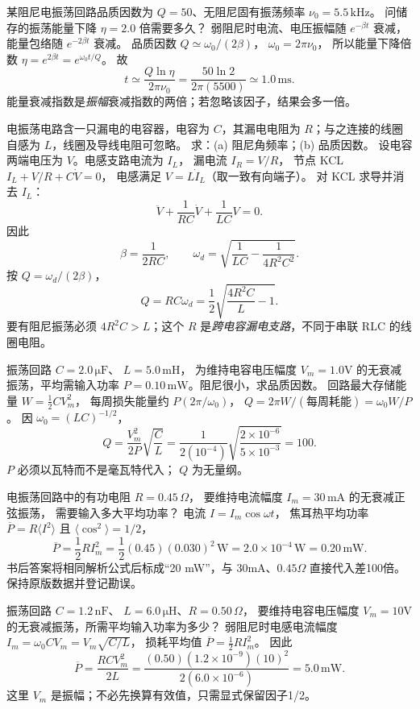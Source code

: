 某阻尼电振荡回路品质因数为 $Q=50$、无阻尼固有振荡频率
$\nu_0=5.5\,\mathrm{kHz}$。
问储存的振荡能量下降 $\eta=2.0$ 倍需要多久？
\exsolution
弱阻尼时电流、电压振幅随 $e^{-\beta t}$ 衰减，能量包络随 $e^{-2\beta t}$ 衰减。
品质因数 $Q\simeq\omega_0/(2\beta)$，
$\omega_0=2\pi\nu_0$，
所以能量下降倍数
$\eta=e^{2\beta t}=e^{\omega_0t/Q}$。
故
\[
\boxed{t\simeq\frac{Q\ln\eta}{2\pi\nu_0}
=\frac{50\ln2}{2\pi(5500)}
\simeq1.0\,\mathrm{ms}}.
\]
\excheck 能量衰减指数是\emph{振幅}衰减指数的两倍；若忽略该因子，结果会多一倍。

电振荡电路含一只漏电的电容器，电容为 $C$，其漏电电阻为 $R$；与之连接的线圈自感为 $L$，线圈及导线电阻可忽略。
求：(a) 阻尼角频率；(b) 品质因数。
\exsolution
设电容两端电压为 $V$。电感支路电流为 $I_L$，
漏电流 $I_R=V/R$，
节点 KCL
$I_L+V/R+C\dot V=0$，
电感满足 $V=L\dot I_L$（取一致有向端子）。
对 KCL 求导并消去 $I_L$：
\[
\ddot V+\frac1{RC}\dot V+\frac1{LC}V=0.
\]
因此
\[
\boxed{\beta=\frac1{2RC}},\qquad
\boxed{\omega_d=\sqrt{\frac1{LC}-\frac1{4R^2C^2}}}.
\]
按 $Q=\omega_d/(2\beta)$，
\[
\boxed{Q=RC\omega_d
=\frac12\sqrt{\frac{4R^2C}{L}-1}}.
\]
\excheck 要有阻尼振荡必须 $4R^2C>L$；这个 $R$ 是\emph{跨电容漏电支路}，不同于串联 RLC 的线圈电阻。

振荡回路 $C=2.0\,\mathrm{\mu F}$、
$L=5.0\,\mathrm{mH}$，
为维持电容电压幅度 $V_m=1.0$V 的无衰减振荡，平均需输入功率
$P=0.10\,\mathrm{mW}$。阻尼很小，求品质因数。
\exsolution
回路最大存储能量
$W=\tfrac12CV_m^2$，
每周损失能量约 $P(2\pi/\omega_0)$，
$Q=2\pi W/(\text{每周耗能})=\omega_0W/P$。
因 $\omega_0=(LC)^{-1/2}$，
\[
\boxed{Q=\frac{V_m^2}{2P}\sqrt{\frac CL}}
=\frac{1}{2(10^{-4})}\sqrt{\frac{2\times10^{-6}}{5\times10^{-3}}}
=\boxed{100}.
\]
\excheck $P$ 必须以瓦特而不是毫瓦特代入；
$Q$ 为无量纲。

电振荡回路中的有功电阻 $R=0.45\,\Omega$，
要维持电流幅度
$I_m=30\,\mathrm{mA}$ 的无衰减正弦振荡，
需要输入多大平均功率？
\exsolution
电流 $I=I_m\cos\omega t$，
焦耳热平均功率
$\overline P=R\langle I^2\rangle$
且 $\langle\cos^2\rangle=1/2$，
\[
\boxed{\overline P=\frac12RI_m^2}
=\frac12(0.45)(0.030)^2\,\mathrm W
=\boxed{2.0\times10^{-4}\,\mathrm W
=0.20\,\mathrm{mW}}.
\]
\excheck 书后答案将相同解析公式后标成“20 mW”，与 $30$mA、$0.45\Omega$ 直接代入差100倍。保持原版数据并登记勘误。

振荡回路 $C=1.2\,\mathrm{nF}$、
$L=6.0\,\mathrm{\mu H}$、$R=0.50\,\Omega$，
要维持电容电压幅度
$V_m=10$V 的无衰减振荡，所需平均输入功率为多少？
\exsolution
弱阻尼时电感电流幅度
$I_m=\omega_0CV_m=
V_m\sqrt{C/L}$，
损耗平均值
$\overline P=\tfrac12 R I_m^2$。
因此
\[
\boxed{\overline P=\frac{RCV_m^2}{2L}}
=\frac{(0.50)(1.2\times10^{-9})(10)^2}
{2(6.0\times10^{-6})}
=\boxed{5.0\,\mathrm{mW}}.
\]
\excheck 这里 $V_m$ 是振幅；不必先换算有效值，只需显式保留因子1/2。

